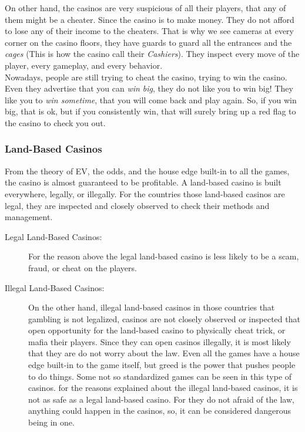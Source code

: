 \documentclass{article}
\begin{document}
On other hand, the casinos are very suspicious of all their players, that any of them might be a cheater.  Since the casino is to make money.  They do not afford to lose any of their income to the cheaters.  That is why we see cameras at every corner on the casino floors, they have guards to guard all the entrances and the \emph{cages} (This is how the casino call their \emph{Cashiers}).  They inspect every move of the player, every gameplay, and every behavior. \\

Nowadays, people are still trying to cheat the casino, trying to win the casino.  Even they advertise that you can \emph{win big}, they do not like you to win big!  They like you to \emph{win sometime}, that you will come back and play again.  So, if you win big, that is ok, but if you consistently win, that will surely bring up a red flag to the casino to check you out.\\
\subsubsection{Land-Based Casinos}
From the theory of EV, the odds, and the house edge built-in to all the games, the casino is almost guaranteed to be profitable.  A land-based casino is built everywhere, legally, or illegally.  For the countries those land-based casinos are legal, they are inspected and closely observed to check their methods and management.  \\
\begin{description}
\item[Legal Land-Based Casinos:] For the reason above the legal land-based casino is less likely to be a scam, fraud, or cheat on the players.  
\item[Illegal Land-Based Casinos:] On the other hand, illegal land-based casinos in those countries that gambling is not legalized, casinos are not closely observed or inspected that open opportunity for the land-based casino to physically cheat trick, or mafia their players.  Since they can open casinos illegally, it is most likely that they are do not worry about the law.  Even all the games have a house edge built-in to the game itself, but greed is the power that pushes people to do things.  Some not so standardized games can be seen in this type of casinos.  for the reasons explained about the illegal land-based casinos, it is not as safe as a legal land-based casino.  For they do not afraid of the law, anything could happen in the casinos, so, it can be considered dangerous being in one. 
\end{description}
\end{document}
